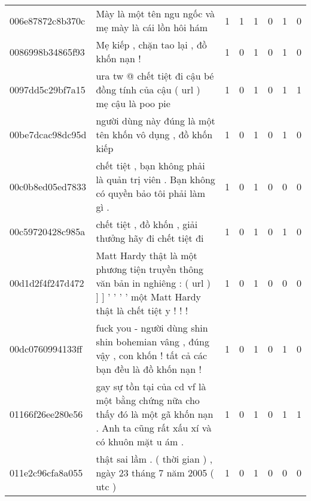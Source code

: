 \begin{sidewaystable}[htb!]
\begin{tabularx}{\textwidth}{L{0.8} L{6.6} C{0.1} C{0.1} C{0.1} C{0.1} C{0.1} C{0.1}}
        006e87872c8b370c & Mày là một tên ngu ngốc và mẹ mày là cái lồn hôi hám                                                                              & 1           & 1           & 1           & 0           & 1           & 0           \\
        0086998b34865f93 & Mẹ kiếp , chặn tao lại , đồ khốn nạn !                                                                                            & 1           & 0           & 1           & 0           & 1           & 0           \\
        0097dd5c29bf7a15 & ura tw @ chết tiệt đi cậu bé đồng tính của cậu ( url ) mẹ cậu là poo pie                                                          & 1           & 0           & 1           & 0           & 1           & 1           \\
        00be7dcac98dc95d & người dùng này đúng là một tên khốn vô dụng , đồ khốn kiếp                                                                        & 1           & 0           & 1           & 0           & 1           & 0           \\
        00c0b8ed05ed7833 & chết tiệt , bạn không phải là quản trị viên . Bạn không có quyền bảo tôi phải làm gì .                                            & 1           & 0           & 1           & 0           & 0           & 0           \\
        00c59720428c985a & chết tiệt , đồ khốn , giải thưởng hãy đi chết tiệt đi                                                                             & 1           & 0           & 1           & 0           & 1           & 0           \\
        00d1d2f4f247d472 & Matt Hardy thật là một phương tiện truyền thông văn bản in nghiêng : ( url ) ] ] ' ' ' ' một Matt Hardy thật là chết tiệt y ! ! ! & 1           & 0           & 1           & 0           & 0           & 0           \\
        00dc0760994133ff & fuck you - người dùng shin shin bohemian vâng , đúng vậy , con khốn ! tất cả các bạn đều là đồ khốn nạn !                         & 1           & 0           & 1           & 0           & 1           & 0           \\
        01166f26ee280e56 & gay sự tồn tại của cd vf là một bằng chứng nữa cho thấy đó là một gã khốn nạn . Anh ta cũng rất xấu xí và có khuôn mặt u ám .     & 1           & 0           & 1           & 0           & 1           & 1           \\
        011e2c96cfa8a055 & thật sai lầm . ( thời gian ) , ngày 23 tháng 7 năm 2005 ( utc )                                                                   & 1           & 0           & 1           & 0           & 0           & 0           \\

\end{tabularx}
\end{sidewaystable}
